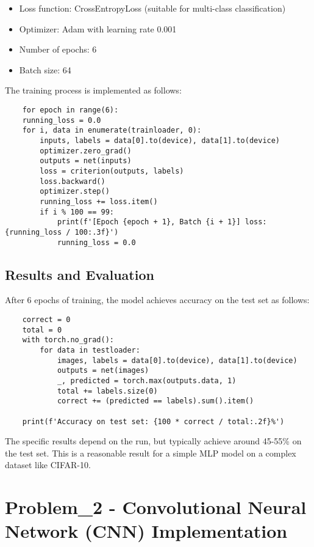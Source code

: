 \documentclass[12pt]{article}
\begin{document}
\begin{itemize}
    \item Loss function: CrossEntropyLoss (suitable for multi-class classification)
    \item Optimizer: Adam with learning rate 0.001
    \item Number of epochs: 6
    \item Batch size: 64
\end{itemize}

The training process is implemented as follows:

\begin{verbatim}
    for epoch in range(6):
    running_loss = 0.0
    for i, data in enumerate(trainloader, 0):
        inputs, labels = data[0].to(device), data[1].to(device)
        optimizer.zero_grad()
        outputs = net(inputs)
        loss = criterion(outputs, labels)
        loss.backward()
        optimizer.step()
        running_loss += loss.item()
        if i % 100 == 99:
            print(f'[Epoch {epoch + 1}, Batch {i + 1}] loss: {running_loss / 100:.3f}')
            running_loss = 0.0
\end{verbatim}

\subsection{Results and Evaluation}

After 6 epochs of training, the model achieves accuracy on the test set as follows:

\begin{verbatim}
    correct = 0
    total = 0
    with torch.no_grad():
        for data in testloader:
            images, labels = data[0].to(device), data[1].to(device)
            outputs = net(images)
            _, predicted = torch.max(outputs.data, 1)
            total += labels.size(0)
            correct += (predicted == labels).sum().item()

    print(f'Accuracy on test set: {100 * correct / total:.2f}%')
\end{verbatim}

The specific results depend on the run, but typically achieve around 45-55\% on the 
test set. This is a reasonable result for a simple MLP model on a complex dataset 
like CIFAR-10.

\section{Problem\_2 - Convolutional Neural Network (CNN) Implementation}
\end{document}
